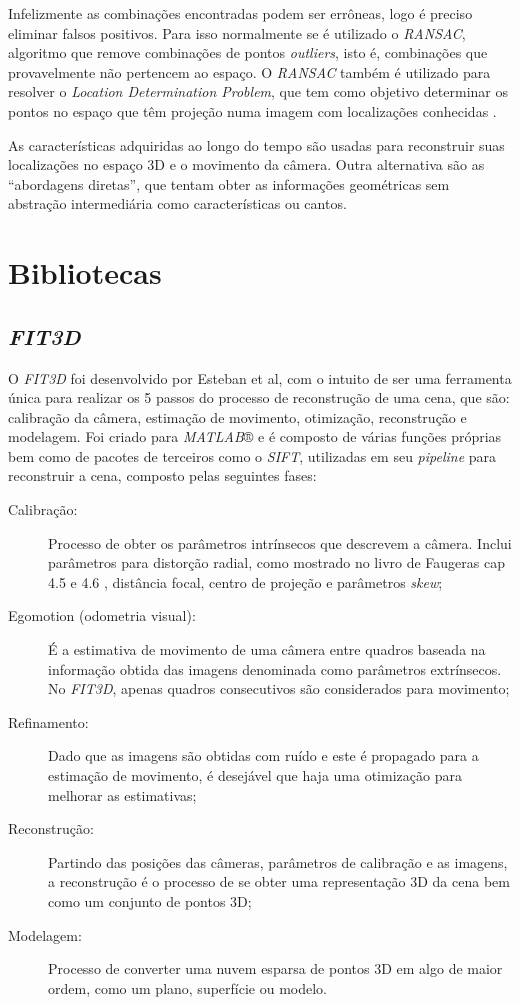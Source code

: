 Infelizmente as combinações encontradas podem ser errôneas, logo é preciso eliminar falsos positivos. Para isso normalmente se é utilizado o \textit{RANSAC}, algoritmo que remove combinações de pontos \textit{outliers}, isto é, combinações que provavelmente não pertencem ao espaço. O \textit{RANSAC} também é utilizado para resolver o \textit{Location Determination Problem}, que tem como objetivo determinar os pontos no espaço que têm projeção numa imagem com localizações conhecidas \cite{RANSAC}.

As características adquiridas ao longo do tempo são usadas para reconstruir suas localizações no espaço 3D e o movimento da câmera. Outra alternativa são as “abordagens diretas”, que tentam obter as informações geométricas sem abstração intermediária como características ou cantos.
  
\section{Bibliotecas}
  
\subsection{\textit{FIT3D}}
O \textit{FIT3D} foi desenvolvido por Esteban et al\cite{FIT3D}, com o intuito de ser uma ferramenta única para realizar os 5 passos do processo de reconstrução de uma cena, que são: calibração da câmera, estimação de movimento, otimização, reconstrução e modelagem. Foi criado para \textit{MATLAB}® e é composto de várias funções próprias bem como de pacotes de terceiros como o \textit{SIFT}, utilizadas em seu \textit{pipeline} para reconstruir a cena, composto pelas seguintes fases:
\begin{description}
 \item[Calibração: ]{Processo de obter os parâmetros intrínsecos que descrevem a câmera. Inclui parâmetros para distorção radial, como mostrado no livro de Faugeras cap 4.5 e 4.6 \cite{Faugeras-Geometry}, distância focal, centro de projeção e parâmetros \textit{skew};}
 \item[Egomotion (odometria visual): ]{É a estimativa de movimento de uma câmera entre quadros baseada na informação obtida das imagens denominada como parâmetros extrínsecos. No \textit{FIT3D}, apenas quadros consecutivos são considerados para movimento;}
 \item[Refinamento: ]{Dado que as imagens são obtidas com ruído e este é propagado para a estimação de movimento, é desejável que haja uma otimização para melhorar as estimativas;}
 \item[Reconstrução: ]{Partindo das posições das câmeras, parâmetros de calibração e as imagens, a reconstrução é o processo de se obter uma representação 3D da cena bem como um conjunto de pontos 3D;}
 \item[Modelagem: ]{Processo de converter uma nuvem esparsa de pontos 3D em algo de maior ordem, como um plano, superfície ou modelo.}
\end{description}
  
